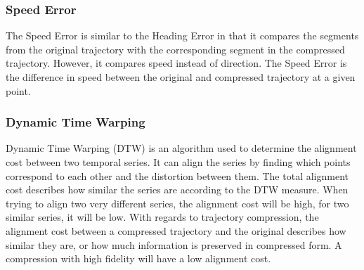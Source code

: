 \subsubsection{Speed Error}
The Speed Error is similar to the Heading Error in that it compares the segments from the original trajectory with the corresponding segment in the compressed trajectory. However, it compares speed instead of direction. The Speed Error is the difference in speed between the original and compressed trajectory at a given point.

\subsubsection{Dynamic Time Warping}
Dynamic Time Warping (DTW) is an algorithm used to determine the alignment cost between two temporal series. It can align the series by finding which points correspond to each other and the distortion between them. The total alignment cost describes how similar the series are according to the DTW measure. When trying to align two very different series, the alignment cost will be high, for two similar series, it will be low. With regards to trajectory compression, the alignment cost between a compressed trajectory and the original describes how similar they are, or how much information is preserved in compressed form. A compression with high fidelity will have a low alignment cost.

